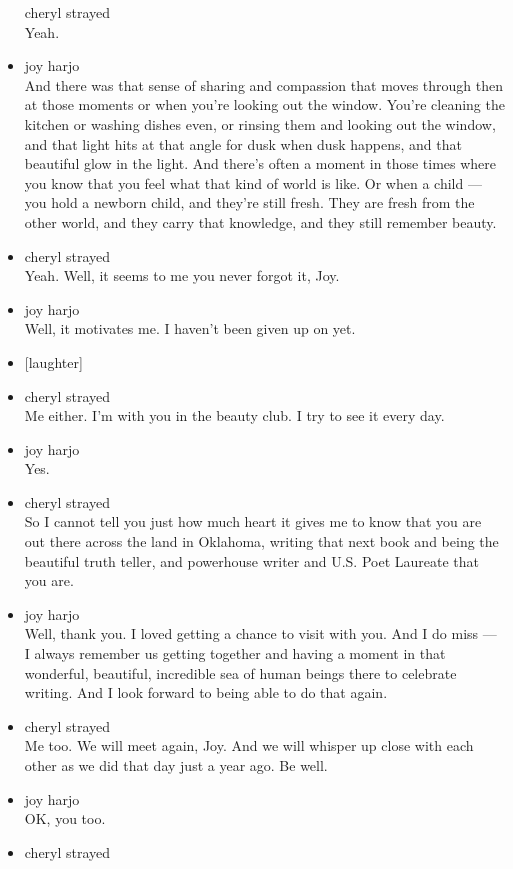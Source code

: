 \begin{itemize}
  cheryl strayed\\
  Yeah.
\item
  joy harjo\\
  And there was that sense of sharing and compassion that moves through
  then at those moments or when you're looking out the window. You're
  cleaning the kitchen or washing dishes even, or rinsing them and
  looking out the window, and that light hits at that angle for dusk
  when dusk happens, and that beautiful glow in the light. And there's
  often a moment in those times where you know that you feel what that
  kind of world is like. Or when a child --- you hold a newborn child,
  and they're still fresh. They are fresh from the other world, and they
  carry that knowledge, and they still remember beauty.
\item
  cheryl strayed\\
  Yeah. Well, it seems to me you never forgot it, Joy.
\item
  joy harjo\\
  Well, it motivates me. I haven't been given up on yet.
\item
  {[}laughter{]}
\item
  cheryl strayed\\
  Me either. I'm with you in the beauty club. I try to see it every day.
\item
  joy harjo\\
  Yes.
\item
  cheryl strayed\\
  So I cannot tell you just how much heart it gives me to know that you
  are out there across the land in Oklahoma, writing that next book and
  being the beautiful truth teller, and powerhouse writer and U.S. Poet
  Laureate that you are.
\item
  joy harjo\\
  Well, thank you. I loved getting a chance to visit with you. And I do
  miss --- I always remember us getting together and having a moment in
  that wonderful, beautiful, incredible sea of human beings there to
  celebrate writing. And I look forward to being able to do that again.
\item
  cheryl strayed\\
  Me too. We will meet again, Joy. And we will whisper up close with
  each other as we did that day just a year ago. Be well.
\item
  joy harjo\\
  OK, you too.
\item
  cheryl strayed\\

\end{itemize}
